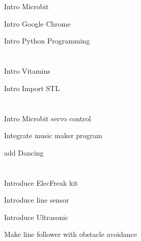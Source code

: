 \documentclass{article}
\begin{document}
\section{\FifthGradeFive}
\begin{todolist}
	\item Intro Microbit
	\item Intro Google Chrome
	\item Intro Python Programming
\end{todolist}
\section{\FifthGradeSix}
\begin{todolist}
	\item Intro Vitamins
	\item Intro Import STL
\end{todolist}
\section{\FifthGradeSeven}
\begin{todolist}
	\item Intro Microbit servo control
	\item Integrate music maker program
	\item add Dancing
\end{todolist}
\section{\FifthGradeEight}
\begin{todolist}
	\item Introduce ElecFreak kit
	\item Introduce line sensor
	\item Introduce Ultrasonic
	\item Make line follower with obstacle avoidance
\end{todolist}
\newpage
\end{document}
